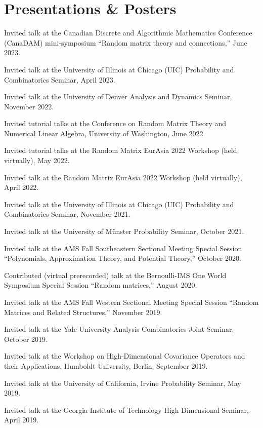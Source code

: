 \documentclass[letterpaper]{article}
\renewenvironment{itemize}{
  \begin{list}{}{
    \setlength{\leftmargin}{1em}
  }
}{
  \end{list}
}
\begin{document}
\section*{Presentations \& Posters}
\begin{itemize}
	\item Invited talk at the Canadian Discrete and Algorithmic Mathematics Conference (CanaDAM) mini-symposium ``Random matrix theory and connections,'' June 2023. 
	\item Invited talk at the University of Illinois at Chicago (UIC) Probability and Combinatorics Seminar, April 2023. 
	\item Invited talk at the University of Denver Analysis and Dynamics Seminar, November 2022.  
	\item Invited tutorial talks at the Conference on Random Matrix Theory and Numerical Linear Algebra, University of Washington, June 2022.  
	\item Invited tutorial talks at the Random Matrix EurAsia 2022 Workshop (held virtually), May 2022.  
	\item Invited talk at the Random Matrix EurAsia 2022 Workshop (held virtually), April 2022.  
	\item Invited talk at the University of Illinois at Chicago (UIC) Probability and Combinatorics Seminar, November 2021.  
	\item Invited talk at the University of M\"{u}nster Probability Seminar, October 2021.
	\item Invited talk at the AMS Fall Southeastern Sectional Meeting Special Session ``Polynomials, Approximation Theory, and Potential Theory,'' October 2020.  
	\item Contributed (virtual prerecorded) talk at the Bernoulli-IMS One World Symposium Special Session ``Random matrices,'' August 2020.  
	\item Invited talk at the AMS Fall Western Sectional Meeting Special Session ``Random Matrices and Related Structures,'' November 2019.  
	\item Invited talk at the Yale University Analysis-Combinatorics Joint Seminar, October 2019.  
	\item Invited talk at the Workshop on High-Dimensional Covariance Operators and their Applications, Humboldt University, Berlin, September 2019.  
	\item Invited talk at the University of California, Irvine Probability Seminar, May 2019.  
	\item Invited talk at the Georgia Institute of Technology High Dimensional Seminar, April 2019.  

\end{itemize}
\end{document}
